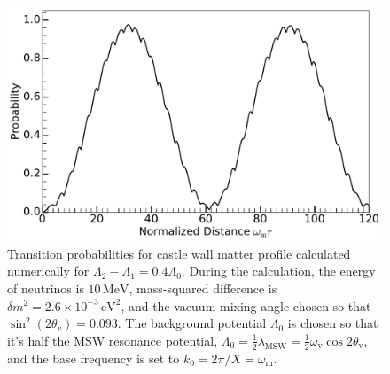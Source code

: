 \documentclass[%
reprint,
 amsmath,amssymb,
 prd,
]{revtex4-1}
\begin{document}
\begin{figure}
        \includegraphics[width=\columnwidth]{assets/castle-wall-1}%
    \caption{Transition probabilities for castle wall matter profile calculated numerically for $\Lambda_2-\Lambda_1=0.4 \Lambda_0$. During the calculation, the energy of neutrinos is $10\,\mathrm{MeV}$, mass-squared difference is $\delta m^2=2.6\times 10^{-3}\,\mathrm{eV^2}$, and the vacuum mixing angle chosen so that $\sin^2(2\theta_v)=0.093$. The background potential $\Lambda_0$ is chosen so that it's half the MSW resonance potential, $\Lambda_0 = \frac{1}{2}\lambda_{\mathrm{MSW}}=\frac{1}{2}\omega_{\mathrm{v}}\cos 2\theta_{\mathrm v}$, and the base frequency is set to $k_0 = 2\pi/X = \omega_{\mathrm{m}}$.
                 }
    \label{fig-akhmedovOscPlt}
\end{figure}
\end{document}
